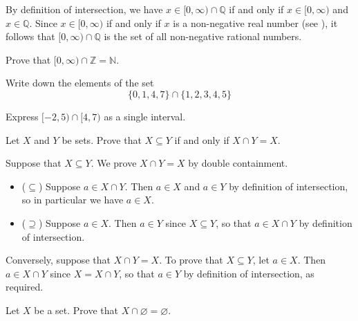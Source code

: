 
\begin{example}
By definition of intersection, we have $x \in [0,\infty) \cap \mathbb{Q}$ if and only if $x \in [0,\infty)$ and $x \in \mathbb{Q}$. Since $x \in [0,\infty)$ if and only if $x$ is a non-negative real number (see ), it follows that $[0,\infty) \cap \mathbb{Q}$ is the set of all non-negative rational numbers.
\end{example}

\begin{exercise}
Prove that $[0,\infty) \cap \mathbb{Z} = \mathbb{N}$.
\end{exercise}

\begin{exercise}
Write down the elements of the set
\[ \{ 0, 1, 4, 7 \} \cap \{ 1, 2, 3, 4, 5 \} \]
\end{exercise}

\begin{exercise}
Express $[-2,5) \cap [4,7)$ as a single interval.
\end{exercise}

\begin{proposition}
\label{propSubsetFromIntersection}
Let $X$ and $Y$ be sets. Prove that $X \subseteq Y$ if and only if $X \cap Y = X$.
\end{proposition}

\begin{cproof}
Suppose that $X \subseteq Y$. We prove $X \cap Y = X$ by double containment.
\begin{itemize}
\item ($\subseteq$) Suppose $a \in X \cap Y$. Then $a \in X$ and $a \in Y$ by definition of intersection, so in particular we have $a \in X$.
\item ($\supseteq$) Suppose $a \in X$. Then $a \in Y$ since $X \subseteq Y$, so that $a \in X \cap Y$ by definition of intersection.
\end{itemize}

Conversely, suppose that $X \cap Y = X$. To prove that $X \subseteq Y$, let $a \in X$. Then $a \in X \cap Y$ since $X = X \cap Y$, so that $a \in Y$ by definition of intersection, as required.
\end{cproof}

\begin{exercise}
Let $X$ be a set. Prove that $X \cap \varnothing = \varnothing$.
\end{exercise}

